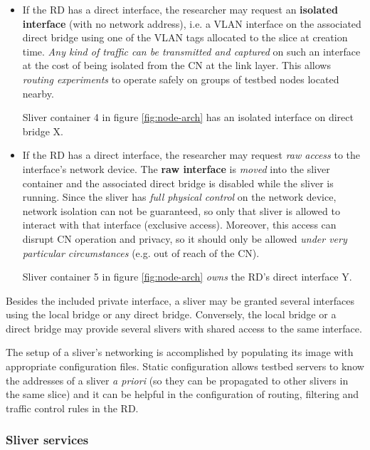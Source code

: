 \documentclass[conference]{IEEEtran}
\begin{document}
\begin{itemize}

\item If the RD has a direct interface, the researcher may request an
  \textbf{isolated interface} (with no network address), i.e. a VLAN interface on the
  associated direct bridge using one of the VLAN tags allocated to the slice
  at creation time.  \emph{Any kind of traffic can be transmitted and
    captured} on such an interface at the cost of being isolated from the CN
  at the link layer.  This allows \emph{routing experiments} to operate safely
  on groups of testbed nodes located nearby.

  Sliver container 4 in figure \ref{fig:node-arch} has an isolated interface
  on direct bridge X.

\item If the RD has a direct interface, the researcher may request \emph{raw
  access} to the interface's network device.  The \textbf{raw interface} is
  \emph{moved} into the sliver container and the associated direct bridge is
  disabled while the sliver is running.  Since the sliver has \emph{full
    physical control} on the network device, network isolation can not be
  guaranteed, so only that sliver is allowed to interact with that interface (exclusive access).  Moreover, this
  access can disrupt CN operation and privacy, so it should only be allowed
  \emph{under very particular circumstances} (e.g. out of reach of the CN).

  Sliver container 5 in figure \ref{fig:node-arch} \emph{owns} the RD's direct
  interface Y.

\end{itemize}

Besides the included private interface, a sliver may be granted several
interfaces using the local bridge or any direct bridge.  Conversely, the local
bridge or a direct bridge may provide several slivers with shared access to
the same interface.

The setup of a sliver's networking is accomplished by populating its image
with appropriate configuration files.  Static configuration allows testbed
servers to know the addresses of a sliver \emph{a priori} (so they can be
propagated to other slivers in the same slice) and it can be helpful in the
configuration of routing, filtering and traffic control rules in the RD.

\subsubsection{Sliver services}
\label{sec:sliver-services}
\end{document}
